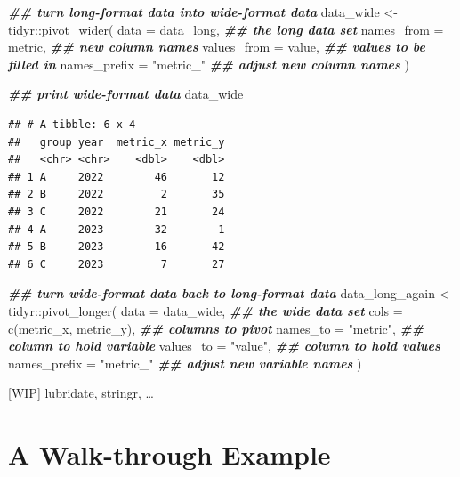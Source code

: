 \documentclass[
]{krantz}
\makeatletter
\newenvironment{Shaded}{\begin{snugshade}}{\end{snugshade}}
\newcommand{\AttributeTok}[1]{\textcolor[rgb]{0.61,0.61,0.61}{#1}}
\newcommand{\DocumentationTok}[1]{\textcolor[rgb]{0.37,0.37,0.37}{\textbf{\textit{#1}}}}
\newcommand{\FunctionTok}[1]{\textcolor[rgb]{0,0,0}{#1}}
\newcommand{\NormalTok}[1]{#1}
\newcommand{\OtherTok}[1]{\textcolor[rgb]{0.37,0.37,0.37}{#1}}
\newcommand{\SpecialCharTok}[1]{\textcolor[rgb]{0,0,0}{#1}}
\newcommand{\StringTok}[1]{\textcolor[rgb]{0.5,0.5,0.5}{#1}}
\newenvironment{kframe}{%
\medskip{}
\setlength{\fboxsep}{.8em}
 \def\at@end@of@kframe{}%
 \ifinner\ifhmode%
  \def\at@end@of@kframe{\end{minipage}}%
  \begin{minipage}{\columnwidth}%
 \fi\fi%
 \def\FrameCommand##1{\hskip\@totalleftmargin \hskip-\fboxsep
 \colorbox{shadecolor}{##1}\hskip-\fboxsep
     \hskip-\linewidth \hskip-\@totalleftmargin \hskip\columnwidth}%
 \MakeFramed {\advance\hsize-\width
   \@totalleftmargin\z@ \linewidth\hsize
   \@setminipage}}%
 {\par\unskip\endMakeFramed%
 \at@end@of@kframe}
\renewenvironment{Shaded}{\begin{kframe}}{\end{kframe}}
\makeatother
\begin{document}
\begin{Shaded}
\begin{Highlighting}[]
\DocumentationTok{\#\# turn long{-}format data into wide{-}format data}
\NormalTok{data\_wide }\OtherTok{\textless{}{-}}\NormalTok{ tidyr}\SpecialCharTok{::}\FunctionTok{pivot\_wider}\NormalTok{(}
  \AttributeTok{data =}\NormalTok{ data\_long,        }\DocumentationTok{\#\# the long data set}
  \AttributeTok{names\_from =}\NormalTok{ metric,     }\DocumentationTok{\#\# new column names}
  \AttributeTok{values\_from =}\NormalTok{ value,     }\DocumentationTok{\#\# values to be filled in}
  \AttributeTok{names\_prefix =} \StringTok{"metric\_"} \DocumentationTok{\#\# adjust new column names}
\NormalTok{)}

\DocumentationTok{\#\# print wide{-}format data}
\NormalTok{data\_wide}
\end{Highlighting}
\end{Shaded}

\begin{verbatim}
## # A tibble: 6 x 4
##   group year  metric_x metric_y
##   <chr> <chr>    <dbl>    <dbl>
## 1 A     2022        46       12
## 2 B     2022         2       35
## 3 C     2022        21       24
## 4 A     2023        32        1
## 5 B     2023        16       42
## 6 C     2023         7       27
\end{verbatim}

\begin{Shaded}
\begin{Highlighting}[]
\DocumentationTok{\#\# turn wide{-}format data back to long{-}format data}
\NormalTok{data\_long\_again }\OtherTok{\textless{}{-}}\NormalTok{ tidyr}\SpecialCharTok{::}\FunctionTok{pivot\_longer}\NormalTok{(}
  \AttributeTok{data =}\NormalTok{ data\_wide,             }\DocumentationTok{\#\# the wide data set}
  \AttributeTok{cols =} \FunctionTok{c}\NormalTok{(metric\_x, metric\_y), }\DocumentationTok{\#\# columns to pivot}
  \AttributeTok{names\_to =} \StringTok{"metric"}\NormalTok{,          }\DocumentationTok{\#\# column to hold variable}
  \AttributeTok{values\_to =} \StringTok{"value"}\NormalTok{,          }\DocumentationTok{\#\# column to hold values}
  \AttributeTok{names\_prefix =} \StringTok{"metric\_"}      \DocumentationTok{\#\# adjust new variable names}
\NormalTok{)}
\end{Highlighting}
\end{Shaded}

{[}WIP{]} lubridate, stringr, \ldots{}

\hypertarget{a-walk-through-example}{%
\chapter{A Walk-through Example}\label{a-walk-through-example}}
\end{document}
